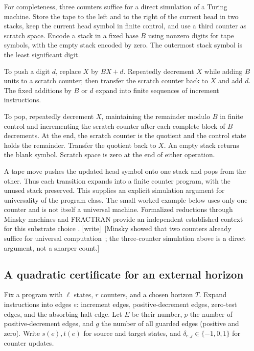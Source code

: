 \documentclass[11pt,a4paper]{article}
\theoremstyle{definition}
\theoremstyle{remark}
\newcommand{\wtag}{\textup{[write]}}
\begin{document}
For completeness, three counters suffice for a direct simulation of a
Turing machine. Store the tape to the left and to the right of the current
head in two stacks, keep the current head symbol in finite control, and
use a third counter as scratch space. Encode a stack in a fixed base $B$
using nonzero digits for tape symbols, with the empty stack encoded by
zero. The outermost stack symbol is the least significant digit.

To push a digit $d$, replace $X$ by $BX+d$. Repeatedly decrement $X$ while
adding $B$ units to a scratch counter; then transfer the scratch counter
back to $X$ and add $d$. The fixed additions by $B$ or $d$ expand into
finite sequences of increment instructions.

To pop, repeatedly decrement $X$, maintaining the remainder modulo $B$ in
finite control and incrementing the scratch counter after each complete
block of $B$ decrements. At the end, the scratch counter is the quotient
and the control state holds the remainder. Transfer the quotient back to
$X$. An empty stack returns the blank symbol. Scratch space is zero at the
end of either operation.

A tape move pushes the updated head symbol onto one stack and pops from
the other. Thus each transition expands into a finite counter program,
with the unused stack preserved. This supplies an explicit simulation
argument for universality of the program class. The small worked example
below uses only one counter and is not itself a universal machine.
Formalized reductions through Minsky machines and FRACTRAN provide an
independent established context for this substrate choice \cite{coq}.
\wtag\ [Minsky showed that two counters already suffice for universal
computation~\cite{minsky}; the three-counter simulation above is a direct
argument, not a sharper count.]

\subsection{A quadratic certificate for an external horizon}

Fix a program with $\ell$ states, $r$ counters, and a chosen horizon $T$.
Expand instructions into edges $e$: increment edges, positive-decrement
edges, zero-test edges, and the absorbing halt edge. Let $E$ be their
number, $p$ the number of positive-decrement edges, and $g$ the number of
all guarded edges (positive and zero). Write $s(e),t(e)$ for source and
target states, and $\delta_{e,j}\in\{-1,0,1\}$ for counter updates.
\end{document}
